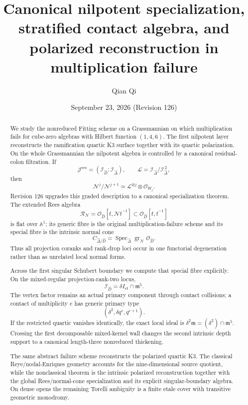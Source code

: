 \title[Canonical nilpotent specialization]{Canonical nilpotent specialization, stratified contact algebra, and polarized reconstruction in multiplication failure}
\author{Qian Qi}
\date{September 23, 2026 \quad (Revision 126)}
\begin{abstract}
We study the nonreduced Fitting scheme on a Grassmannian on which
multiplication fails for cube-zero algebras with Hilbert function
\((1,4,6)\). The first nilpotent layer reconstructs the ramification
quartic K3 surface together with its quartic polarization. On the
whole Grassmannian the nilpotent algebra is controlled by a canonical
residual-colon filtration. If
\[
 \mathcal J^{\mathrm{res}}=(\mathcal I_{\widehat D}:\mathcal I_{\widehat\Delta}),
 \qquad
 \mathcal L=\mathcal I_{\widehat\Delta}/\mathcal I_{\widehat\Delta}^{\,2},
\]
then
\[
 \mathcal N^j/\mathcal N^{j+1}
 \simeq
 \mathcal L^{\otimes j}\otimes\mathcal O_{W_j}.
\]
Revision 126 upgrades this graded description to a canonical
specialization theorem. The extended Rees algebra
\[
 \mathscr R_{\mathcal N}
 =
 \mathcal O_{\widehat D}[t,\mathcal N t^{-1}]
 \subset
 \mathcal O_{\widehat D}[t,t^{-1}]
\]
is flat over \(\mathbb A^1\); its generic fibre is the original
multiplication-failure scheme and its special fibre is the intrinsic
normal cone
\[
 C_{\widehat\Delta/\widehat D}
 =
 \operatorname{Spec}_{\widehat\Delta}
 \operatorname{gr}_{\mathcal N}\mathcal O_{\widehat D}.
\]
Thus all projection coranks and rank-drop loci occur in one
functorial degeneration rather than as unrelated local normal forms.

Across the first singular Schubert boundary we compute that special
fibre explicitly. On the mixed-regular projection-rank-two locus,
\[
 \mathcal I_{\widehat D}=\delta I_{\mathrm{ct}}\cap\mathfrak m^5.
\]
The vertex factor remains an actual primary component through contact
collisions; a contact of multiplicity \(e\) has generic primary type
\[
 (\delta^2,\delta q^e,q^{e+1}).
\]
If the restricted quartic vanishes identically, the exact local ideal
is \(\delta^2\mathfrak m=(\delta^2)\cap\mathfrak m^5\). Crossing the
first decomposable mixed-kernel wall changes the second intrinsic
depth support to a canonical length-three nonreduced thickening.

The same abstract failure scheme reconstructs the polarized quartic
K3. The classical Reye/nodal-Enriques geometry accounts for the
nine-dimensional source quotient, while the nonclassical theorem is
the intrinsic polarized reconstruction together with the global
Rees/normal-cone specialization and its explicit singular-boundary
algebra. On dense opens the remaining Torelli ambiguity is a finite
etale cover with transitive geometric monodromy.
\end{abstract}
\maketitle
